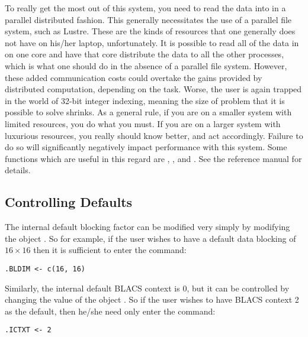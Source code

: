 To really get the most out of this system, you need to read the data into  in a parallel distributed fashion.  This generally necessitates the use of a parallel file system, such as Lustre.  These are the kinds of resources that one generally does not have on his/her laptop, unfortunately.  It is possible to read all of the data in on one core and have that core distribute the data to all the other processes, which is what one should do in the absence of a parallel file system.  However, these added communication costs could  overtake the gains provided by distributed computation, depending on the task.  Worse, the user is again trapped in the world of 32-bit integer indexing, meaning the size of problem that it is possible to solve shrinks.
\np
As a general rule, if you are on a smaller system with limited resources, you do what you must.  If you are on a larger system with luxurious resources, you really should know better, and act accordingly.  Failure to do so will significantly negatively impact performance with this system.
\np
Some functions which are useful in this regard are , , and .  See the reference manual for details.





\subsection[]{Controlling Defaults}

The internal default blocking factor can be modified very simply by modifying the object .  So for example, if the user wishes to have a default data blocking of $16\times 16$ then it is sufficient to enter the command:
\begin{lstlisting}[language=rr]
.BLDIM <- c(16, 16)
\end{lstlisting}

Similarly, the internal default BLACS context is 0, but it can be controlled by changing the value of the object .  So if the user wishes to have BLACS context 2 as the default, then he/she need only enter the command:
\begin{lstlisting}[language=rr]
.ICTXT <- 2
\end{lstlisting}
